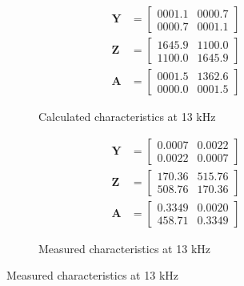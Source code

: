 \documentclass[notitlepage, a4paper, 11pt]{article}
\begin{document}
		\begin{figure}[H]
		\begin{subfigure}{0.45\textwidth}
			\begin{align*}
				\mathbf{Y} &= 
				\begin{bmatrix}
					0001.1  &  0000.7 \\
					0000.7  &  0001.1
				\end{bmatrix}
				\\
				\mathbf{Z} &= 
				\begin{bmatrix}
					1645.9  &  1100.0 \\
					1100.0  &  1645.9
				\end{bmatrix}
				\\
				\mathbf{A} &= 
				\begin{bmatrix}
					0001.5 &   1362.6 \\
					0000.0 &   0001.5
				\end{bmatrix}
			\end{align*}
			\caption{Calculated characteristics at 13 kHz}
		\end{subfigure}
		\hfill
		\begin{subfigure}{0.45\textwidth}
			\begin{align*}
				\mathbf{Y} &= 
				\begin{bmatrix}
					0.0007   & 0.0022 \\
					0.0022   & 0.0007
				\end{bmatrix}
				\\
				\mathbf{Z} &= 		
				\begin{bmatrix}
					170.36 & 515.76 \\
					508.76 & 170.36
				\end{bmatrix}
				\\
				\mathbf{A} &=
				\begin{bmatrix}
					0.3349  &  0.0020 \\
					458.71  &  0.3349
				\end{bmatrix} 
			\end{align*}
			\caption{Measured characteristics at 13 kHz}
		\end{subfigure}
		

\end{figure}
\end{document}
